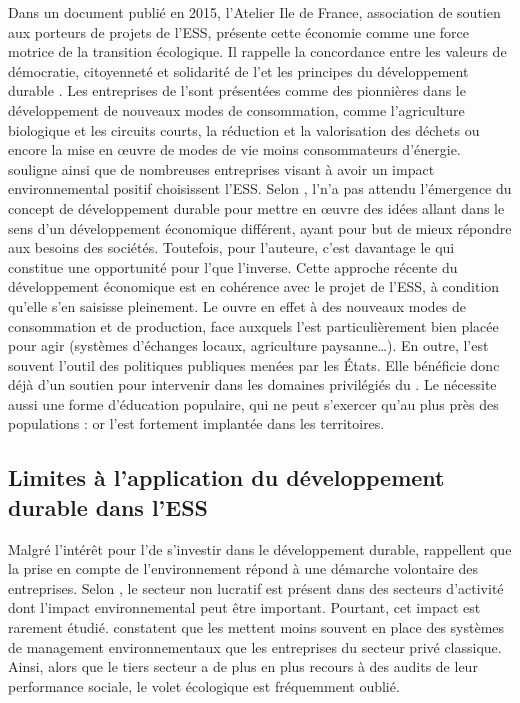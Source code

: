             Dans un document publié en 2015, l’Atelier Ile de France, association de soutien aux porteurs de projets de l’ESS, présente cette économie comme une force motrice de la transition écologique. Il rappelle la concordance entre les valeurs de démocratie, citoyenneté et solidarité de l’\ess et les principes du développement durable \parencite{latelier_ile_de_france2015economie}. Les entreprises de l’\ess sont présentées comme des pionnières dans le développement de nouveaux modes de consommation, comme l’agriculture biologique et les circuits courts, la réduction et la valorisation des déchets ou encore la mise en œuvre de modes de vie moins consommateurs d’énergie. \textcite{waridel2016economie} souligne ainsi que de nombreuses entreprises visant à avoir un impact environnemental positif choisissent l’ESS. Selon \textcite{cretieneau2010economie}, l’\ess n’a pas attendu l’émergence du concept de développement durable pour mettre en œuvre des idées allant dans le sens d’un développement économique différent, ayant pour but de mieux répondre aux besoins des sociétés. Toutefois, pour l’auteure, c’est davantage le \dd qui constitue une opportunité pour l’\ess que l’inverse. Cette approche récente du développement économique est en cohérence avec le projet de l’ESS, à condition qu’elle s’en saisisse pleinement. Le \dd ouvre en effet à des nouveaux modes de consommation et de production, face auxquels l’\ess est particulièrement bien placée pour agir (systèmes d’échanges locaux, agriculture paysanne…). En outre, l’\ess est souvent l’outil des politiques publiques menées par les États. Elle bénéficie donc déjà d’un soutien pour intervenir dans les domaines privilégiés du \dd. Le \dd nécessite aussi une forme d’éducation populaire, qui ne peut s’exercer qu’au plus près des populations : or l’\ess est fortement implantée dans les territoires.

    \subsection{Limites à l’application du développement durable dans l’ESS}

        Malgré l’intérêt pour l’\ess de s’investir dans le développement durable, \textcite{bocquet2010economie} rappellent que la prise en compte de l’environnement répond à une démarche volontaire des entreprises. Selon \textcite{dart2010green}, le secteur non lucratif est présent dans des secteurs d’activité dont l’impact environnemental peut être important. Pourtant, cet impact est rarement étudié. \textcite{edwards2013environmental} constatent que les \eess mettent moins souvent en place des systèmes de management environnementaux que les entreprises du secteur privé classique. Ainsi, alors que le tiers secteur a de plus en plus recours à des audits de leur performance sociale, le volet écologique est fréquemment oublié.

